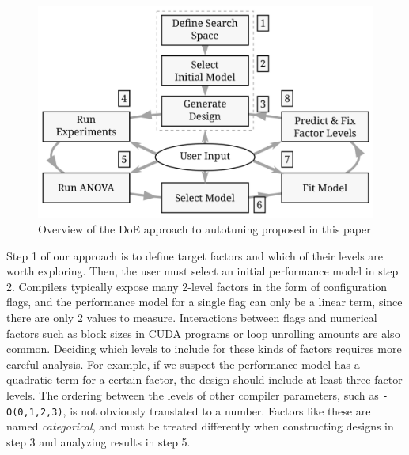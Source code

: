 \documentclass[conference]{IEEEtran}
\begin{document}
\begin{figure}[b]\vspace{-.5cm}
\centering
\includegraphics[width=.95\columnwidth]{./img/doe_anova_strategy.pdf}
\caption{\label{fig:org45b5375}
Overview of the DoE approach to autotuning proposed in this paper}
\end{figure}

Step 1 of our approach is to define target factors and which of their levels are
worth exploring.  Then, the  user must  select an  initial performance  model in
step  2.  Compilers  typically  expose  many 2-level  factors  in  the  form  of
configuration flags, and the  performance model for a single flag  can only be a
linear term,  since there  are only  2 values  to measure.  Interactions between
flags  and numerical  factors  such as  block  sizes in  CUDA  programs or  loop
unrolling amounts  are also common. Deciding  which levels to include  for these
kinds of factors requires more careful  analysis. For example, if we suspect the
performance model has  a quadratic term for a certain  factor, the design should
include at least  three factor levels. The ordering between  the levels of other
compiler parameters,  such as \texttt{-O(0,1,2,3)}, is  not obviously translated
to  a number.  Factors like  these are  named \emph{categorical},  and must  be treated
differently when constructing designs in step 3 and analyzing results in step 5.
\end{document}
